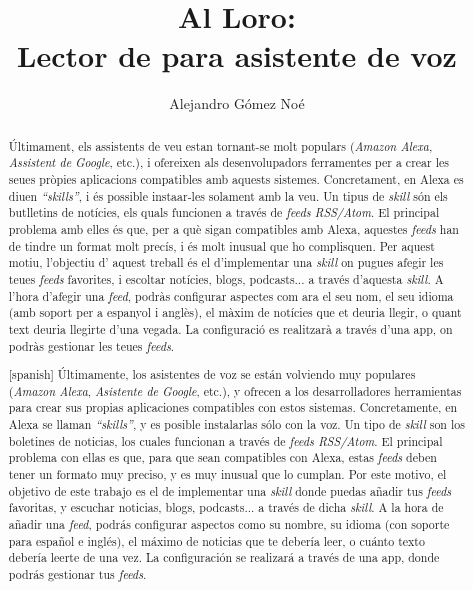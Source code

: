 \documentclass[11pt,spanish,listoffigures,listoftables,table,hyphens,dvipsnames]{tfgetsinf}
\title{Al Loro: \\
         Lector de \fe{feeds RSS} para asistente de voz}
\author{Alejandro Gómez Noé}
\begin{document}


\begin{abstract}
   Últimament, els assistents de veu estan tornant-se molt populars (\emph{Amazon Alexa}, \emph{Assistent de Google}, etc.), i ofereixen als desenvolupadors ferramentes per a crear les seues pròpies aplicacions compatibles amb aquests sistemes. Concretament, en Alexa es diuen \emph{``skills''}, i és possible insta{\lgem}ar-les solament amb la veu. Un tipus de \textit{skill} són els butlletins de notícies, els quals funcionen a través de \emph{feeds RSS/Atom}. El principal problema amb elles és que, per a què sigan compatibles amb Alexa, aquestes \textit{feeds} han de tindre un format molt precís, i és molt inusual que ho complisquen. Per aquest motiu, l'objectiu d' aquest treball és el d'implementar una \textit{skill} on pugues afegir les teues \textit{feeds} favorites, i escoltar notícies, blogs, podcasts... a través d'aquesta \textit{skill}. A l'hora d'afegir una \textit{feed}, podràs configurar aspectes com ara el seu nom, el seu idioma (amb soport per a espanyol i anglès), el màxim de notícies que et deuria llegir, o quant text deuria llegirte d'una vegada. La configuració es realitzarà a través d'una app, on podràs gestionar les teues \textit{feeds}.
\end{abstract}


\begin{abstract}[spanish]
   Últimamente, los asistentes de voz se están volviendo muy populares (\emph{Amazon Alexa}, \emph{Asistente de Google}, etc.), y ofrecen a los desarrolladores herramientas para crear sus propias aplicaciones compatibles con estos sistemas. Concretamente, en Alexa se llaman \emph{``skills''}, y es posible instalarlas sólo con la voz. Un tipo de \textit{skill} son los boletines de noticias, los cuales funcionan a través de \emph{feeds RSS/Atom}. El principal problema con ellas es que, para que sean compatibles con Alexa, estas \textit{feeds} deben tener un formato muy preciso, y es muy inusual que lo cumplan. Por este motivo, el objetivo de este trabajo es el de implementar una \textit{skill} donde puedas añadir tus \textit{feeds} favoritas, y escuchar noticias, blogs, podcasts... a través de dicha \textit{skill}. A la hora de añadir una \textit{feed}, podrás configurar aspectos como su nombre, su idioma (con soporte para español e inglés), el máximo de noticias que te debería leer, o cuánto texto debería leerte de una vez. La configuración se realizará a través de una app, donde podrás gestionar tus \textit{feeds}.
\end{abstract}
\end{document}
